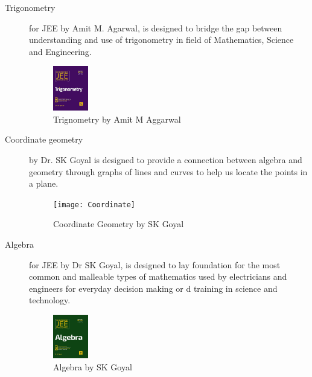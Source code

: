 \documentclass{article}
\begin{document}
	\begin{description}
	
	\item [Trigonometry] for JEE by Amit M. Agarwal, is designed to bridge the gap between understanding and use of trigonometry in field of Mathematics, Science and Engineering.
        
        \begin{figure}[htp]
        	\begin{center}
        		\includegraphics[width=0.15\textwidth]{Trig}
        	\end{center}
        \label{fig: Trig}
        \caption{Trignometry by Amit M Aggarwal}
        \end{figure}
    
    \item [Coordinate geometry] by Dr. SK Goyal is designed to provide a connection between algebra and geometry through graphs of lines and curves to help us locate the points in a plane.
        
        \begin{figure}[htp]
        	\begin{center}
        		\texttt{[image: Coordinate]}
        	\end{center}
        \label{fig: Coordinate}
        \caption{Coordinate Geometry by SK Goyal}
        \end{figure}
    
    \item [Algebra] for JEE by Dr SK Goyal, is designed to lay foundation for the most common and malleable types of mathematics used by electricians and engineers for everyday decision making or d training in science and technology.
        
        \begin{figure}[htp]
        	\begin{center}
        		\includegraphics[width=0.15\textwidth]{Alg}
        	\end{center}
        \label{fig: Alg}
        \caption{Algebra by SK Goyal}
        \end{figure}
    

\end{description}
\end{document}
